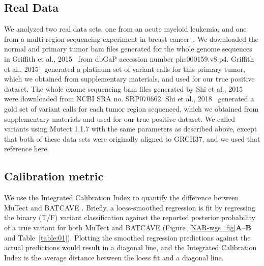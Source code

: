 \documentclass[a4,center,fleqn]{NAR}
\newcommand{\batcave}{BATCAVE }
\begin{document}
\subsection{Real Data}
We analyzed two real data sets, one from an acute myeloid leukemia, and one from a multi-region sequencing experiment in breast cancer~\cite{Griffith2015,Shi2018}.
We downloaded the normal and primary tumor bam files generated for the whole genome sequences in Griffith et al., 2015~\citep{Griffith2015} from dbGaP accession number phs000159.v8.p4.
Griffith et al., 2015~\citep{Griffith2015} generated a platinum set of variant calls for this primary tumor, which we obtained from supplementary materials, and used for our true positive dataset.
The whole exome sequencing bam files generated by Shi et al., 2015~\citep{Shi2018} were downloaded from NCBI SRA no. SRP070662.
Shi et al., 2018~\citep{Shi2018} generated a gold set of variant calls for each tumor region sequenced, which we obtained from supplementary materials and used for our true positive dataset.
We called variants using Mutect 1.1.7 with the same parameters as described above, except that both of these data sets were originally aligned to GRCH37, and we used that reference here.

\subsection{Calibration metric}

	We use the Integrated Calibration Index to quantify the difference between MuTect and \batcave \cite{Austin2019}.
	Briefly, a loess-smoothed regression is fit by regressing the binary (T/F) variant classification against the reported posterior probability of a true variant for both MuTect and \batcave (Figure~\ref{NAR-wgs_fig}\textbf{A}--\textbf{B} and Table~\ref{table:01}).
	Plotting the smoothed regression predictions against the actual predictions would result in a diagonal line, and the Integrated Calibration Index is the average distance between the loess fit and a diagonal line.
\end{document}
